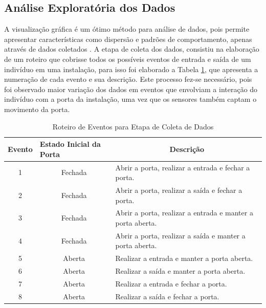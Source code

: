 \subsection{Análise Exploratória dos Dados}
\label{subsec:exploratory_data_analysis}

A visualização gráfica é um ótimo método para análise de dados, pois permite apresentar características como dispersão e padrões de comportamento, apenas através de dados coletados \cite{wohlin2012experimentation}. A etapa de coleta dos dados, consistiu na elaboração de um roteiro que cobrisse todos os possíveis eventos de entrada e saída de um indivíduo em uma instalação, para isso foi elaborado a Tabela \ref{tab:events_description}, que apresenta a numeração de cada evento e sua descrição. Este processo fez-se necessário, pois foi observado maior variação dos dados em eventos que envolviam a interação do indivíduo com a porta da instalação, uma vez que os sensores também captam o movimento da porta.

\renewcommand{\arraystretch}{1.3}
\begin{table}[H]
	\centering
	\caption{Roteiro de Eventos para Etapa de Coleta de Dados}
	\label{tab:events_description}
	\begin{tabular}{|c|c|l|}
		\hline
		\multicolumn{1}{|l|}{\textbf{Evento}} & \multicolumn{1}{l|}{\textbf{Estado Inicial da Porta}} & \multicolumn{1}{c|}{\textbf{Descrição}}                    \\ \hline
		1                                     & Fechada                                               & Abrir a porta, realizar a entrada e fechar a porta.        \\
		2                                     & Fechada                                               & Abrir a porta, realizar a saída e fechar a porta.          \\
		3                                     & Fechada                                               & Abrir a porta, realizar a entrada e manter a porta aberta. \\
		4                                     & Fechada                                               & Abrir a porta, realizar a saída e manter a porta aberta.   \\
		5                                     & Aberta                                                & Realizar a entrada e manter a porta aberta.                \\
		6                                     & Aberta                                                & Realizar a saída e manter a porta aberta.                  \\
		7                                     & Aberta                                                & Realizar a entrada e fechar a porta.                       \\
		8                                     & Aberta                                                & Realizar a saída e fechar a porta.                         \\ \hline
	\end{tabular}
\end{table}

